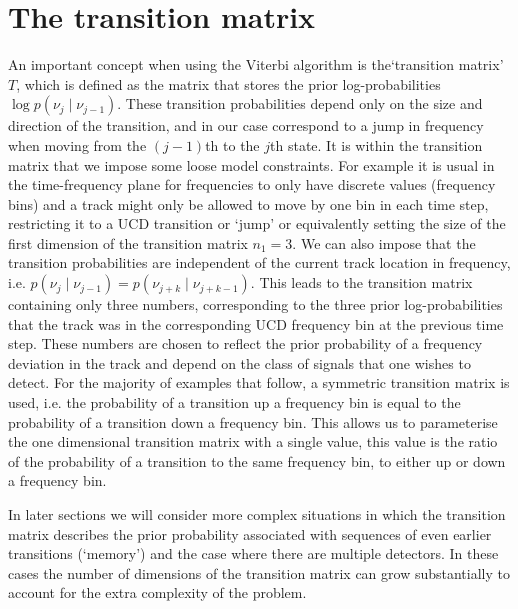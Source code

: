 \section{\label{viterbi:transition}The transition matrix}
%
%
An important concept when using the Viterbi algorithm is the`transition matrix' $T$, which is defined as the matrix that stores the prior log-probabilities $\log p(\nu_j \mid \nu_{j-1})$. These transition probabilities depend only on the size and direction of the transition, and in our case correspond to a jump in frequency when moving from the $(j-1)$th to the $j$th state. It is within the transition matrix that we impose some loose model constraints. For example it is usual in the time-frequency plane for frequencies to only have discrete values (frequency bins) and a track might only be allowed to move by one bin in each time step, restricting it to a \ac{UCD} transition or `jump' or equivalently setting the size of the first dimension of the transition matrix $n_1 = 3$. We can also impose that the transition probabilities are independent of the current track location in frequency, i.e. $p(\nu_j \mid \nu_{j-1})=p(\nu_{j+k} \mid \nu_{j+k-1})$. This leads to the transition matrix containing only three numbers, corresponding to the three prior log-probabilities that the track was in the corresponding \ac{UCD} frequency bin at the previous time step. These numbers are chosen to reflect the prior probability of a frequency deviation in the track and depend on the class of signals that one wishes to detect.
For the majority of examples that follow, a symmetric transition matrix is used, i.e. the probability of a transition up a frequency bin is equal to the probability of a transition down a frequency bin. This allows us to parameterise the one dimensional transition matrix with a single value, this value is the ratio of the probability of a transition to the same frequency bin, to either up or down a frequency bin. 

In later sections we will consider more complex situations in which the transition matrix describes the prior probability associated with sequences of even earlier transitions (`memory') and the case where there are multiple detectors. In these cases the number of dimensions of the transition matrix can grow substantially to account for the extra complexity of the problem.

